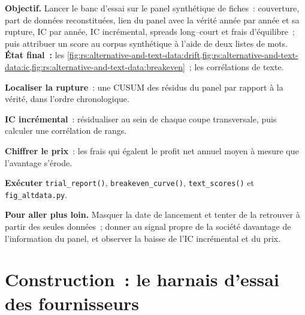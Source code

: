 \begin{tutorial}
\textbf{Objectif.} Lancer le banc d'essai sur le panel synthétique de fiches~: couverture, part de données reconstituées, lien du panel avec la vérité année par année et
sa rupture, IC par année, IC incrémental, spreads long--court et frais d'équilibre~; puis attribuer un score au corpus synthétique à l'aide de deux listes de mots.
\textbf{État final~:}
les \cref{fig:rs:alternative-and-text-data:drift,fig:rs:alternative-and-text-data:ic,fig:rs:alternative-and-text-data:breakeven}~; les
corrélations de texte.
\begin{tutsteps}
\item \textbf{Localiser la rupture}~: une CUSUM des résidus du panel par rapport à la vérité, dans l'ordre chronologique.
\label{lst:rs:alternative-and-text-data:cusum}
\item \textbf{IC incrémental}~: résidualiser au sein de chaque coupe transversale, puis calculer une corrélation de rangs.
\label{lst:rs:alternative-and-text-data:inc}
\item \textbf{Chiffrer le prix}~: les frais qui égalent le profit net annuel moyen à mesure que l'avantage s'érode.
\label{lst:rs:alternative-and-text-data:fee}
\item \textbf{Exécuter} \texttt{trial\_report()}, \texttt{breakeven\_curve()}, \texttt{text\_scores()} et \texttt{fig\_altdata.py}.
\end{tutsteps}
\textbf{Pour aller plus loin.} Masquer la date de lancement et tenter de la retrouver à partir des seules données~; donner au signal propre de la société davantage de
l'information du panel, et observer la baisse de l'IC incrémental et du prix.
\end{tutorial}

\section{Construction~: le harnais d'essai des fournisseurs}\label{bld:rs:alternative-and-text-data:vendoreval}

